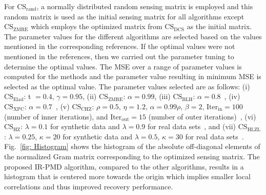 For $\text{CS}_{\text{rand}}$, a normally distributed random sensing matrix is employed and this random matrix is used as the initial sensing matrix for all algorithms except $\text{CS}_{\text{ZMRE}}$ which employs the optimized matrix from $\text{CS}_{\text{DCS}}$ as the initial matrix. The parameter values for the different algorithms are selected based on the values mentioned in the corresponding references. If the optimal values were not mentioned in the references, then we carried out the parameter tuning to determine the optimal values. The MSE over a range of parameter values is computed for the methods and the parameter value resulting in minimum MSE is selected as the optimal value. The parameter values selected are as follows: (i) $\text{CS}_{\text{Elad}}$: t $=0.4$, $ \gamma=0.95$, (ii) $\text{CS}_{\text{ZMRE}}$: $\alpha=0.99$, (iii) $\text{CS}_{\text{BLH}}$: $\alpha = 0.8$~\cite{SRE_Huang}, (iv) $\text{CS}_{\text{XPC}}$: $\alpha=0.7$~\cite{Xuprojection}, (v) $\text{CS}_{\text{CHZ}}$: $\rho=0.5$, $\eta=1.2$, $\alpha=0.99\rho$, $\beta=2$, $\text{Iter}_{\text{in}}=100$ (number of inner iterations), and $\text{Iter}_{\text{out}}=15$ (number of outer iterations)~\cite{CHZ}, (vi) $\text{CS}_{\text{HZ}}$: $\lambda=0.1$ for synthetic data and $\lambda=0.9$ for real data sets~\cite{HONG_robust}, and (vii) $\text{CS}_{\text{HLZL}}$: $\lambda=0.25$, $\kappa=20$ for synthetic data and $\lambda=0.5$, $\kappa=30$ for real data sets~\cite{HONG_sparse}. Fig.~\ref{fig: Histogram} shows the histogram of the absolute off-diagonal elements of the normalized Gram matrix corresponding to the optimized sensing matrix. The proposed IR-PMD algorithm, compared to the other algorithms, results in a histogram that is centered more towards the origin which implies smaller local correlations and thus improved recovery performance. 
%
